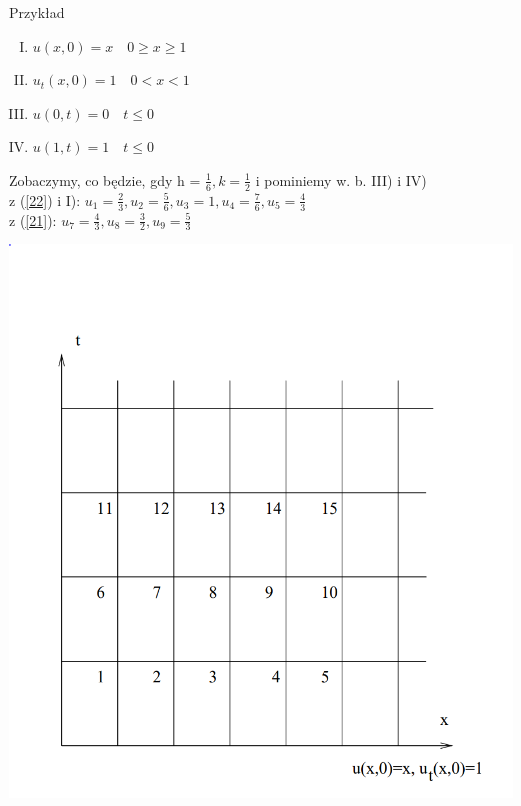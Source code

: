 \begin{frame}
  \begin{exampleblock}{Przykład}
      \begin{enumerate}[I.]
       \item $u(x,0) = x \quad 0 \ge x \ge 1$ \\
	\item $u_t(x,0) = 1\quad 0 < x < 1$ \\
      \item $u(0,t) = 0 \quad t \le 0$ \\
	\item $u(1,t) = 1 \quad t \le 0$
\end{enumerate}
  \end{exampleblock}
\vspace{5mm}
Zobaczymy, co będzie, gdy h = $\frac{1}{6}, k =\frac{1}{2}$ i pominiemy w. b. III) i IV) \\
\vspace{5mm}
z (\ref{22}) i I): $u_1 = \frac{2}{3}, u_2 = \frac{5}{6}, u_3 = 1, u_4 = \frac{7}{6}, u_5 = \frac{4}{3}$ \\
\vspace{3mm}
z (\ref{21}): $u_7 = \frac{4}{3}, u_8 = \frac{3}{2}, u_9 = \frac{5}{3}$
\end{frame}

\begin{frame}
 \centerline{\includegraphics[height = 1 \textheight]{img/23/stab2}}
\end{frame}

